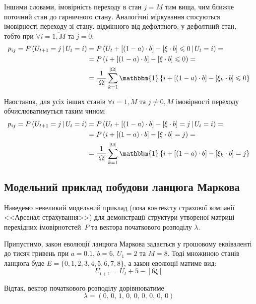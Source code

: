 \documentclass{mathreport}
\begin{document}
Іншими словами, імовірність переходу в стан $j=M$ тим вища, чим ближче поточний стан до гарничного стану. Аналогічні міркування стосуються імовірності переходу зі стану, відмінного від дефолтного, у дефолтний стан, тобто при $\forall i=\overline{1,M}$ та $j=0:$ 
\begin{align}\label{eq: j=0 transition matrix}
    p_{ij} = P\left( U_{t+1}=j \,|\, U_{t}=i \right) & = P\left( U_{t} + [(1-a) \cdot b] - [\xi \cdot b] \leqslant 0 \,|\, U_{t}=i \right) = \notag \\
    & = P\left( i + [(1-a) \cdot b] - [\xi \cdot b] \leqslant 0 \right) = \notag \\
    & = \frac{1}{|\Omega|}\sum\limits_{k=1}^{|\Omega|}\mathbbm{1}\left\{ i + [(1-a) \cdot b] - [\xi_k \cdot b] \leqslant 0 \right\}
\end{align} 

Наостанок, для усіх інших станів $\forall i=\overline{1,M}$ та $j\neq 0,M$ імовірності переходу  обчислюватимуться таким чином:
\begin{align}\label{eq: j transition matrix}
    p_{ij} = P\left( U_{t+1}=j \,|\, U_{t}=i \right) & = P\left( U_{t} + [(1-a) \cdot b] - [\xi \cdot b] = j \,|\, U_{t}=i \right) = \notag \\
    & = P\left( i + [(1-a) \cdot b] - [\xi \cdot b] = j \right) = \notag \\
    & = \frac{1}{|\Omega|}\sum\limits_{k=1}^{|\Omega|}\mathbbm{1}\left\{ i + [(1-a) \cdot b] - [\xi_k \cdot b] = j \right\}
\end{align} 

\subsection{Модельний приклад побудови ланцюга Маркова}

Наведемо невеликий модельний приклад (поза контексту страхової компанії <<Арсенал страхування>>) для демонстрації структури утвореної матриці перехідних імовірнотстей~$P$ та вектора початкового розподілу $\lambda$. 

Припустимо, закон еволюції ланцюга Маркова задається у грошовому еквіваленті до тисяч гривень при $a = 0.1$, $b = 6$, $U_1 = 2$ та $M = 8$. Тоді множиною станів ланцюга буде $E=\{ 0,1,2,3,4,5,6,7,8 \}$, а закон еволюції матиме вид:
\begin{equation}\label{eq: test capital evolution}
    U_{t+1} = U_{t} + 5 - [6\xi]
\end{equation}

Відтак, вектор початкового розподілу дорівнюватиме
\begin{equation}\label{eq: test initial distribution}
    \lambda = (0,\, 0,\, 1,\, 0,\, 0,\, 0,\, 0,\, 0,\, 0)
\end{equation}
\end{document}
